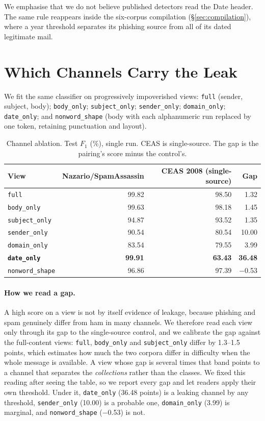 \documentclass[twoside,11pt]{article}
\newcommand{\gd}[1]{\textbf{#1}}
\begin{document}
We emphasise that we do not believe published detectors read the Date header.
The same rule reappears inside the six-corpus compilation
(\S\ref{sec:compilation}), where a year threshold separates its phishing
source from all of its dated legitimate mail.

\section{Which Channels Carry the Leak}
\label{sec:probe}

We fit the same classifier on progressively impoverished views: \texttt{full}
(sender, subject, body); \texttt{body\_only}; \texttt{subject\_only};
\texttt{sender\_only}; \texttt{domain\_only}; \texttt{date\_only}; and
\texttt{nonword\_shape} (body with each alphanumeric run replaced by one
token, retaining punctuation and layout).

\begin{table}[t]
\centering\small
\caption{Channel ablation. Test $F_1$ (\%), single run. CEAS is
single-source. The gap is the pairing's score minus the control's.}
\label{tab:probe}
\begin{tabular}{lrrr}
\toprule
View & Nazario/SpamAssassin & CEAS 2008 (single-source) & Gap \\
\midrule
\texttt{full}            & 99.82 & 98.50 & 1.32 \\
\texttt{body\_only}      & 99.63 & 98.18 & 1.45 \\
\texttt{subject\_only}   & 94.87 & 93.52 & 1.35 \\
\texttt{sender\_only}    & 90.54 & 80.54 & 10.00 \\
\texttt{domain\_only}    & 83.54 & 79.55 & 3.99 \\
\gd{\texttt{date\_only}} & \gd{99.91} & \gd{63.43} & \gd{36.48} \\
\texttt{nonword\_shape}  & 96.86 & 97.39 & $-$0.53 \\
\bottomrule
\end{tabular}
\end{table}

\paragraph{How we read a gap.} A high score on a view is not by itself
evidence of leakage, because phishing and spam genuinely differ from ham in
many channels. We therefore read each view only through its gap to the
single-source control, and we calibrate the gap against the full-content
views: \texttt{full}, \texttt{body\_only} and \texttt{subject\_only} differ by
1.3--1.5 points, which estimates how much the two corpora differ in
difficulty when the whole message is available. A view whose gap is several
times that band points to a channel that separates the \emph{collections}
rather than the classes. We fixed this reading after seeing the table, so we
report every gap and let readers apply their own threshold. Under it,
\texttt{date\_only} (36.48 points) is a leaking channel by any threshold,
\texttt{sender\_only} (10.00) is a probable one, \texttt{domain\_only} (3.99)
is marginal, and \texttt{nonword\_shape} ($-$0.53) is not.
\end{document}
